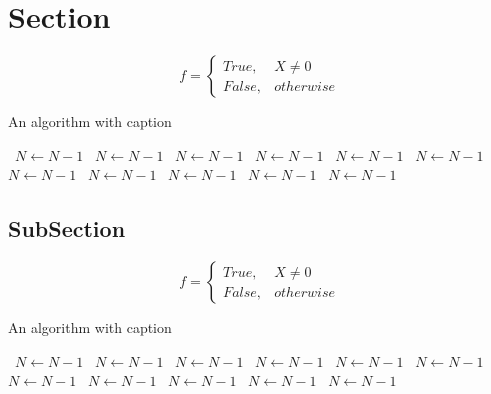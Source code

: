 \documentclass[a4paper]{article}
\begin{document}
\section{Section}

\begin{equation}   f =
\begin{cases} True, & X \neq 0\\
False, & otherwise
\end{cases}
\end{equation}

\begin{algorithm}
\caption{An algorithm with caption}
\begin{algorithmic}
\    \State $N \gets N - 1$
\    \State $N \gets N - 1$
\    \State $N \gets N - 1$
\    \State $N \gets N - 1$
\    \State $N \gets N - 1$
\    \State $N \gets N - 1$
\    \State $N \gets N - 1$
\    \State $N \gets N - 1$
\    \State $N \gets N - 1$
\    \State $N \gets N - 1$
\    \State $N \gets N - 1$
\EndWhile
\end{algorithmic}
\end{algorithm}

\subsection{SubSection}

\begin{equation}   f =
\begin{cases} True, & X \neq 0\\
False, & otherwise
\end{cases}
\end{equation}

\begin{algorithm}
\caption{An algorithm with caption}
\begin{algorithmic}
\    \State $N \gets N - 1$
\    \State $N \gets N - 1$
\    \State $N \gets N - 1$
\    \State $N \gets N - 1$
\    \State $N \gets N - 1$
\    \State $N \gets N - 1$
\    \State $N \gets N - 1$
\    \State $N \gets N - 1$
\    \State $N \gets N - 1$
\    \State $N \gets N - 1$
\    \State $N \gets N - 1$
\EndWhile
\end{algorithmic}
\end{algorithm}
\end{document}
